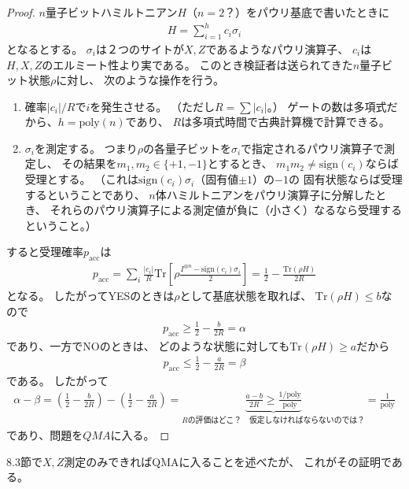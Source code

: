 \documentclass[a4paper, 10pt]{jsarticle}
\begin{document}
\begin{proof}
	$n$量子ビットハミルトニアン$H$（$n = 2$？）をパウリ基底で書いたときに
	\begin{align}
		H = \sum_{i=1}^{h} c_i \sigma_i
	\end{align}
	となるとする。
	$\sigma_i$は２つのサイトが$X, Z$であるようなパウリ演算子、
	$c_i$は$H, X, Z$のエルミート性より実である。
	このとき検証者は送られてきた$n$量子ビット状態$\rho$に対し、
	次のような操作を行う。
	\begin{enumerate}
		\item 確率$|c_i| / R$で$i$を発生させる。
		（ただし$R = \sum |c_i|$。）
		ゲートの数は多項式だから、$h = \mathrm{poly}(n)$であり、
		$R$は多項式時間で古典計算機で計算できる。
		\item $\sigma_i$を測定する。
		つまり$\rho$の各量子ビットを$\sigma_i$で指定されるパウリ演算子で測定し、
		その結果を$m_1, m_2 \in \{+1, -1\}$とするとき、
		$m_1 m_2 \neq \mathrm{sign}(c_i)$ならば受理とする。
		（これは$\mathrm{sign}(c_i) \sigma_i$（固有値$\pm 1$）の$-1$の
		固有状態ならば受理するということであり、
		$n$体ハミルトニアンをパウリ演算子に分解したとき、
		それらのパウリ演算子による測定値が負に（小さく）なるなら受理するということ。）
	\end{enumerate}
	すると受理確率$p_\mathrm{acc}$は
	\begin{align}
		p_\mathrm{acc} = \sum_i \frac{|c_i|}{R} \mathrm{Tr} \left[
			\rho \frac{I^{\otimes n} - \mathrm{sign}(c_i) \sigma_i}{2}
		\right]
		= \frac{1}{2} - \frac{\mathrm{Tr}(\rho H)}{2R}
	\end{align}
	となる。
	したがってYESのときは$\rho$として基底状態を取れば、
	$\mathrm{Tr}(\rho H) \leq b$なので
	\begin{align}
		p_\mathrm{acc} \geq \frac{1}{2} - \frac{b}{2R} = \alpha
	\end{align}
	であり、一方でNOのときは、
	どのような状態に対しても$\mathrm{Tr}(\rho H) \geq a$だから
	\begin{align}
		p_\mathrm{acc} \leq \frac{1}{2} - \frac{a}{2R} = \beta
	\end{align}
	である。
	したがって
	\begin{align}
		\alpha - \beta
		= \left( \frac{1}{2} - \frac{b}{2R} \right)
		- \left( \frac{1}{2} - \frac{a}{2R} \right)
		= \underbrace{\frac{a - b}{2R}
		\geq \frac{1/\mathrm{poly}}{\mathrm{poly}}}_
		{\text{$R$の評価はどこ？　仮定しなければならないのでは？}}
		= \frac{1}{\mathrm{poly}}
	\end{align}
	であり、問題を$QMA$に入る。
\end{proof}
8.3節で$X, Z$測定のみできればQMAに入ることを述べたが、
これがその証明である。
\end{document}
